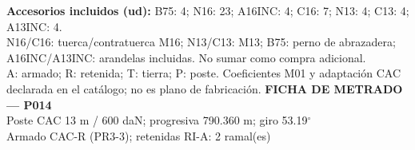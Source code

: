 \begingroup\scriptsize
\textbf{Accesorios incluidos (ud):} B75: 4; N16: 23; A16INC: 4; C16: 7; N13: 4; C13: 4; A13INC: 4.\\
N16/C16: tuerca/contratuerca M16; N13/C13: M13; B75: perno de abrazadera; A16INC/A13INC: arandelas incluidas. No sumar como compra adicional.\\
A: armado; R: retenida; T: tierra; P: poste. Coeficientes M01 y adaptación CAC declarada en el catálogo; no es plano de fabricación.
\endgroup\endgroup
\clearpage{}
\begingroup\small\setlength{\parskip}{3pt}\renewcommand{\arraystretch}{1.05}
\textbf{\large FICHA DE METRADO — P014}\\[4pt]
Poste CAC 13 m / 600 daN; progresiva 790.360 m; giro 53.19\ensuremath{^\circ}\\
Armado CAC-R (PR3-3); retenidas RI-A: 2 ramal(es)\\
\begingroup\scriptsize
